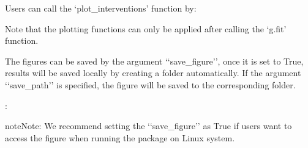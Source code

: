 \documentclass[letterpaper,10pt,english]{sphinxmanual}
\begin{document}
\sphinxAtStartPar
Users can call the ‘plot\_interventions’ function by:
\begin{quote}

\begin{sphinxVerbatim}[commandchars=\\\{\}]
\end{sphinxVerbatim}
\end{quote}

\sphinxAtStartPar
Note that the plotting functions can only be applied after calling the ‘g.fit’ function.

\sphinxAtStartPar
The figures can be saved by the argument ‘‘save\_figure’’, once it is set to True,
results will be saved locally by creating a folder automatically. If the argument ‘‘save\_path’’ is specified, the figure will be saved to the corresponding folder.

\sphinxAtStartPar
{}:

\begin{sphinxVerbatim}[commandchars=\\\{\}]
 \PYG{p}{[} \PYG{p}{]}    
 \PYG{p}{[}  \PYG{p}{]}    
\end{sphinxVerbatim}

\begin{sphinxadmonition}{note}{Note:}
\sphinxAtStartPar
We recommend setting the ‘‘save\_figure’’ as True if users want to access the figure
when running the package on Linux system.
\end{sphinxadmonition}
\end{document}
